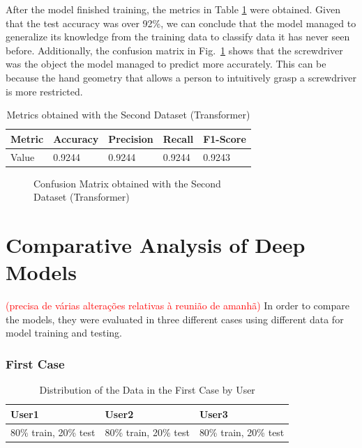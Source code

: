 After the model finished training, the metrics in Table \ref{table:transformer_dataset2_results} were obtained. Given that the test accuracy was over 92\%, we can conclude that the model managed to generalize its knowledge from the training data to classify data it has never seen before. Additionally, the confusion matrix in Fig.~\ref{fig:transformer_dataset2_confusion_matrix} shows that the screwdriver was the object the model managed to predict more accurately. This can be because the hand geometry that allows a person to intuitively grasp a screwdriver is more restricted.

\begin{table}[H]
    \centering
    \caption{Metrics obtained with the Second Dataset (Transformer)}
    \label{table:transformer_dataset2_results}
    \begin{tabular}{|l|l|l|l|l|}
        \hline
        Metric & Accuracy & Precision & Recall & F1-Score \\
        \hline
        Value & 0.9244 & 0.9244 & 0.9244 & 0.9243 \\
        \hline
    \end{tabular}
\end{table}

\begin{figure}[H]
    \centering
    {\fontsize{10}{12}\selectfont}
    \caption[Confusion Matrix obtained with the Second Dataset (Transformer)]{Confusion Matrix obtained with the Second\\Dataset (Transformer)}
    \label{fig:transformer_dataset2_confusion_matrix}
\end{figure}

\section{Comparative Analysis of Deep Models}
\label{section:comparative_analysis}

\textcolor{red}{(precisa de várias alterações relativas à reunião de amanhã)}
In order to compare the models, they were evaluated in three different cases using different data for model training and testing.

\subsubsection{First Case}

\begin{table}[H]
    \centering
    \caption{Distribution of the Data in the First Case by User}
    \label{table:data_distribution_first_case}
    \begin{tabular}{|l|l|l|}
        \hline
        User1 & User2 & User3 \\
        \hline
        80\% train, 20\% test & 80\% train, 20\% test & 80\% train, 20\% test \\
        \hline
    \end{tabular}
\end{table}

